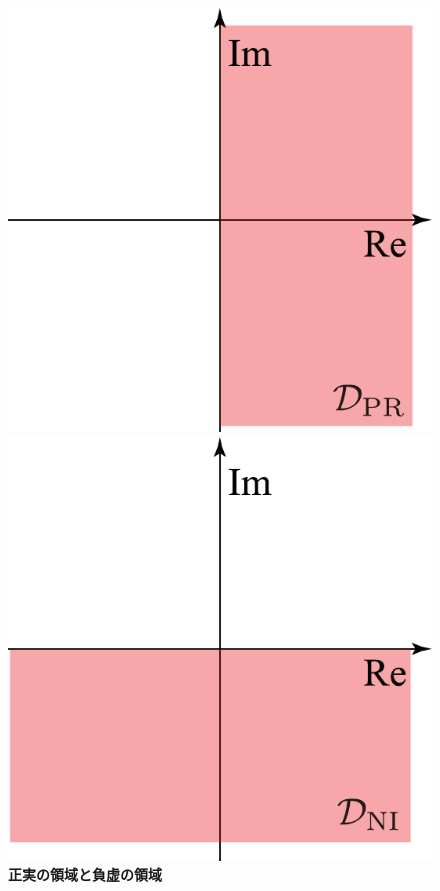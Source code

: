 \documentclass[tombow,dvipdfmx]{corona-a5-1.1}
\begin{document}
\begin{figure}[t]
  \centering
  {
  \begin{minipage}{0.49\linewidth}
    \centering
    \includegraphics[width = .65\linewidth]{figs/PRdom}
    \medskip
  \end{minipage}
  \begin{minipage}{0.49\linewidth}
    \centering
    \includegraphics[width = .65\linewidth]{figs/NIdom}
    \medskip
  \end{minipage}
  }
  \medskip
  \caption{\textbf{正実の領域と負虚の領域}}
  \label{fig:PRandNI}
\medskip
\end{figure}
\end{document}
